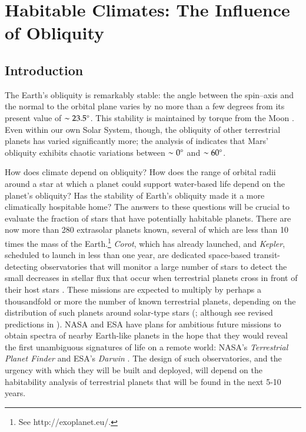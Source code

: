 \chapter[Habitable Climates: The Influence of Obliquity]{Habitable Climates: The Influence of Obliquity}
\label{ch:obl}
\markright{}



\section{Introduction}
\label{obl_sec:intro}

The Earth's obliquity is remarkably stable: the angle between the
spin--axis and the normal to the orbital plane varies by no more than
a few degrees from its present value of $\sim 23.5\mbox{$^\circ$}$.  This
stability is maintained by torque from the Moon
\citep{laskar_et_al1993,nerondesurgy+laskar1997}.  Even within our own
Solar System, though, the obliquity of other terrestrial planets has
varied significantly more; the analysis of \citet{laskar+robutel1993}
indicates that Mars' obliquity exhibits chaotic variations between
$\sim 0\mbox{$^\circ$}$ and $\sim 60\mbox{$^\circ$}$.

How does climate depend on obliquity?  How does the range of orbital
radii around a star at which a planet could support water-based life
depend on the planet's obliquity?  Has the stability of Earth's
obliquity made it a more climatically hospitable home?  The answers to
these questions will be crucial to evaluate the fraction of stars that
have potentially habitable planets.  There are now more than 280
extrasolar planets known, several of which are less than 10 times the
mass of the Earth.\footnote{See http://exoplanet.eu/.}  {\it Corot},
which has already launched, and {\it Kepler}, scheduled to launch in
less than one year, are dedicated space-based transit-detecting
observatories that will monitor a large number of stars to detect the
small decreases in stellar flux that occur when terrestrial planets
cross in front of their host stars
\citep{baglin2003,borucki_et_al2003,borucki_et_al2007}.  These
missions are expected to multiply by perhaps a thousandfold or more
the number of known terrestrial planets, depending on the distribution
of such planets around solar-type stars (\citealt{borucki_et_al2007,
borucki_et_al2003, basri_et_al2005}; although see revised predictions
in \citealt{beatty+gaudi2008}).  NASA and ESA have plans for ambitious
future missions to obtain spectra of nearby Earth-like planets in the
hope that they would reveal the first unambiguous signatures of life
on a remote world: NASA's {\it Terrestrial Planet Finder} and ESA's
{\it Darwin} \citep{leger+herbst2007}.  The design of such
observatories, and the urgency with which they will be built and
deployed, will depend on the habitability analysis of terrestrial
planets that will be found in the next 5-10 years.

